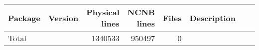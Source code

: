 \begin{tabular}{|l|r|r|r|r|r|r|r|}\hline
Package & Version & Physical lines & NCNB lines & Files & Description\\\hline
Total &   & 1340533 & 950497 & 0 &  \\\hline
\end{tabular}
